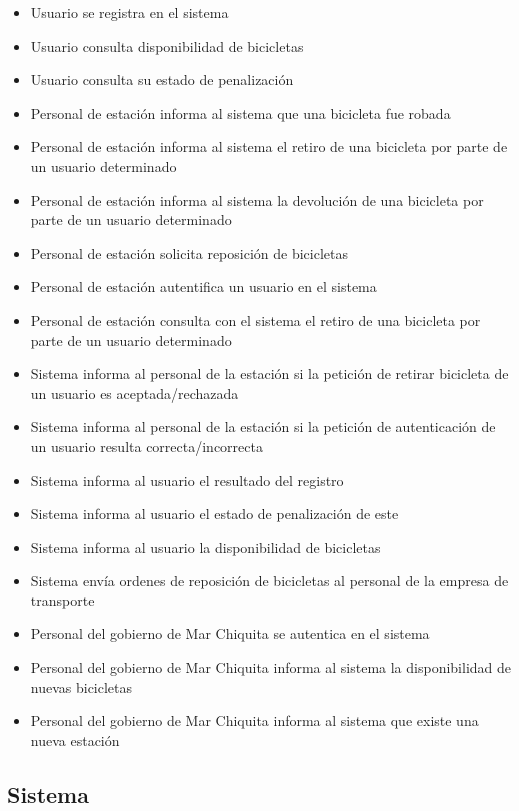 \documentclass[a4paper, 10pt, twoside]{article}
\begin{document}
\begin{multicols}{2}
  \begin{itemize}
    \item Usuario se registra en el sistema
    \item Usuario consulta disponibilidad de bicicletas
    \item Usuario consulta su estado de penalización
    \item Personal de estación informa al sistema que una bicicleta fue robada
    \item Personal de estación informa al sistema el retiro de una bicicleta por parte de un usuario determinado
    \item Personal de estación informa al sistema la devolución de una bicicleta por parte de un usuario determinado
    \item Personal de estación solicita reposición de bicicletas
    \item Personal de estación autentifica un usuario en el sistema
    \item Personal de estación consulta con el sistema el retiro de una bicicleta por parte de un usuario determinado
    \item Sistema informa al personal de la estación si la petición de retirar bicicleta de un usuario es aceptada/rechazada
    \item Sistema informa al personal de la estación si la petición de autenticación de un usuario resulta correcta/incorrecta
    \item Sistema informa al usuario el resultado del registro
    \item Sistema informa al usuario el estado de penalización de este
    \item Sistema informa al usuario la disponibilidad de bicicletas
    \item Sistema envía ordenes de reposición de bicicletas al personal de la empresa de transporte
    \item Personal del gobierno de Mar Chiquita se autentica en el sistema
    \item Personal del gobierno de Mar Chiquita informa al sistema la disponibilidad de nuevas bicicletas
    \item Personal del gobierno de Mar Chiquita informa al sistema que existe una nueva estación

  \end{itemize}
\end{multicols}


\subsection{Sistema}
\end{document}
